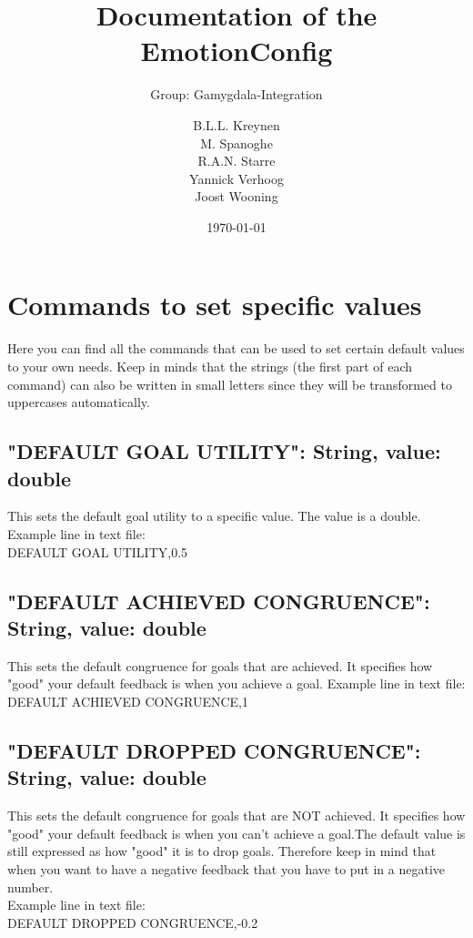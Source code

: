 \documentclass{scrartcl}
\begin{document}
\title{Documentation of the EmotionConfig}
\subtitle{Group: Gamygdala-Integration}
\date{\today{}}

\author{
    \begin{tabular}{l r}
      B.L.L. Kreynen\\
      M. Spanoghe\\
      R.A.N. Starre\\
      Yannick Verhoog\\
      Joost Wooning\\
    \end{tabular}
}

\maketitle \thispagestyle{empty} \pagebreak

\section*{Commands to set specific values}
Here you can find all the commands that can be used to set certain default values to your own needs. Keep in minds that the strings (the first part of each command) can also be written in small letters since they will be transformed to uppercases automatically.

\subsection*{"DEFAULT GOAL UTILITY": String, value: double}
This sets the default goal utility to a specific value. The value is a double.\\
Example line in text file:\\
DEFAULT GOAL UTILITY,0.5\\

\subsection*{"DEFAULT ACHIEVED CONGRUENCE": String, value: double}
This sets the default congruence for goals that are achieved. It specifies how "good" your default feedback is when you achieve a goal.
Example line in text file:\\
DEFAULT ACHIEVED CONGRUENCE,1\\

\subsection*{"DEFAULT DROPPED CONGRUENCE": String, value: double}
This sets the default congruence for goals that are NOT achieved. It specifies how "good" your default feedback is when you can't achieve a goal.The default value is still expressed as how "good" it is to drop goals. Therefore keep in mind that when you want to have a negative feedback that you have to put in a negative number.\\
Example line in text file:\\
DEFAULT DROPPED CONGRUENCE,-0.2\\
\end{document}
